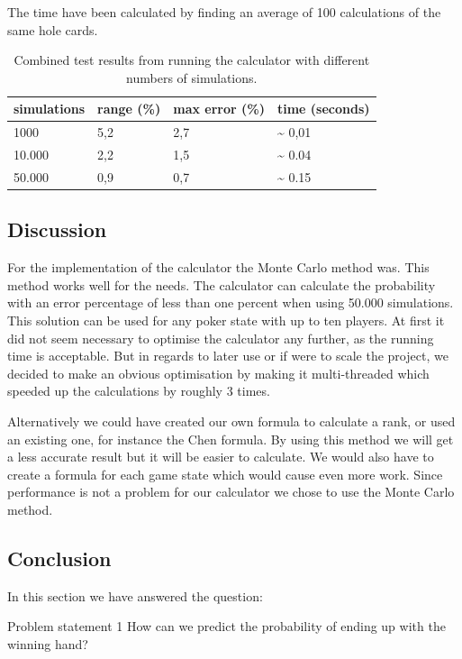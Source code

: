 The time have been calculated by finding an average of 100 calculations of the same hole cards.
\vspace{4mm}
\begin{table}[H]
  \center
  \begin{tabular}{ | l | l | l | l | }
    \hline
    simulations & range (\%) & max error (\%) & time (seconds) \\
    \hline                       
    1000 & 5,2 & 2,7 & \textasciitilde{ 0,01} \\
    10.000 & 2,2 & 1,5 & \textasciitilde{ 0.04}\\
    50.000 & 0,9 & 0,7 & \textasciitilde{ 0.15}\\
  \hline  
  \end{tabular}
  \caption{Combined test results from running the calculator with different numbers of simulations. \label{tab:mc-total}}
\end{table}
\vspace{4mm}

\subsection{Discussion}
For the implementation of the calculator the Monte Carlo method was. This method works well for the needs. The calculator can calculate the probability with an error percentage of less than one percent when using 50.000 simulations. This solution can be used for any poker state with up to ten players. At first it did not seem necessary to optimise the calculator any further, as the running time is acceptable. But in regards to later use or if were to scale the project, we decided to make an obvious optimisation by making it multi-threaded which speeded up the calculations by roughly 3 times.	

Alternatively we could have created our own formula to calculate a rank, or used an existing one, for instance the Chen formula. By using this method we will get a less accurate result but it will be easier to calculate. We would also have to create a formula for each game state which would cause even more work. Since performance is not a problem for our calculator we chose to use the Monte Carlo method.

\subsection{Conclusion}
In this section we have answered the question:
\vspace{4mm}
\begin{statementBox2}{Problem statement 1}
How can we predict the probability of ending up with the winning hand?
\end{statementBox2}
\vspace{4mm}

